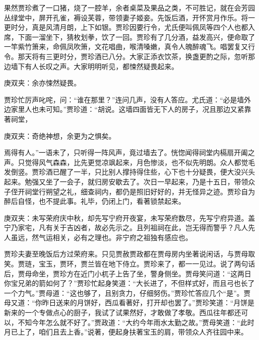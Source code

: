 \begin{parag}
    果然贾珍煮了一口猪，烧了一腔羊，余者桌菜及果品之类，不可胜记，就在会芳园丛绿堂中，屏开孔雀，褥设芙蓉，带领妻子姬妾。先饭后酒，开怀赏月作乐。将一更时分，真是风清月朗，上下如银。贾珍因要行令，尤氏便叫佩凤等四个人也都入席，下面一溜坐下，猜枚划拳，饮了一回。贾珍有了几分酒，益发高兴，便命取了一竿紫竹箫来，命佩凤吹箫，文花唱曲，喉清嗓嫩，真令人魄醉魂飞。唱罢复又行令。那天将有三更时分，贾珍酒已八分。大家正添衣饮茶，换盏更酌之际，忽听那边墙下有人长叹之声。大家明明听见，都悚然疑畏起来。\begin{note}庚双夹：余亦悚然疑畏。\end{note}贾珍忙厉声叱咤，问：“谁在那里？”连问几声，没有人答应。尤氏道：“必是墙外边家里人也未可知。”贾珍道：“胡说。这墙四面皆无下人的房子，况且那边又紧靠著祠堂，\begin{note}庚双夹：奇绝神想，余更为之惧矣。\end{note}焉得有人。”一语未了，只听得一阵风声，竟过墙去了。恍惚闻得祠堂内槅扇开阖之声。只觉得风气森森，比先更觉凉飒起来，月色惨淡，也不似先明朗。众人都觉毛发倒竖。贾珍酒已醒了一半，只比别人撑持得住些，心下也十分疑畏，便大没兴头起来。勉强又坐了一会子，就归房安歇去了。次日一早起来，乃是十五日，带领众子侄开祠堂行朔望之礼，细查祠内，都仍是照旧好好的，并无怪异之迹。贾珍自为醉后自怪，也不提此事。礼毕，仍闭上门，看著锁禁起来。\begin{note}庚双夹：未写荣府庆中秋，却先写宁府开夜宴，未写荣府数尽，先写宁府异道。盖宁乃家宅，凡有关于吉凶者，故必先示之。且列祖祠在此，岂无得而警乎？凡人先人虽远，然气运相关，必有之理也。非宁府之祖独有感应也。\end{note}
\end{parag}


\begin{parag}
    贾珍夫妻至晚饭后方过荣府来。只见贾赦贾政都在贾母房内坐著说闲话，与贾母取笑。贾琏，宝玉，贾环，贾兰皆在地下侍立。贾珍来了，都一一见过。说了两句话后，贾母命坐，贾珍方在近门小杌子上告了坐，警身侧坐。贾母笑问道：“这两日你宝兄弟的箭如何了？”贾珍忙起身笑道：“大长进了，不但样式好，而且弓也长了一个力气。”贾母道：“这也够了，且别贪力，仔细努伤。”贾珍忙答应几个“是”。贾母又道：“你昨日送来的月饼好，西瓜看著好，打开却也罢了。”贾珍笑道：“月饼是新来的一个专做点心的厨子，我试了试果然好，才敢做了孝敬。西瓜往年都还可以，不知今年怎么就不好了。”贾政道：“大约今年雨水太勤之故。”贾母笑道：“此时月已上了，咱们且去上香。”说著，便起身扶著宝玉的肩，带领众人齐往园中来。
\end{parag}


